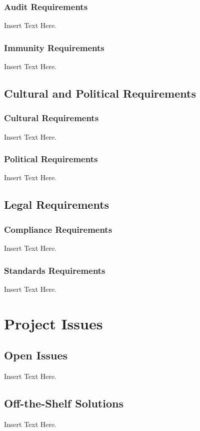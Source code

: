 \documentclass [12pt]{article}
\begin{document}
\subsubsection{Audit  Requirements }
		Insert Text Here. 

\subsubsection{Immunity Requirements  }
		Insert Text Here.

\subsection{Cultural and Political Requirements } 
\subsubsection{Cultural Requirements }
		Insert Text Here.

\subsubsection{Political Requirements }
		Insert Text Here.


\subsection{Legal Requirements}
\subsubsection{Compliance Requirements }
		Insert Text Here.
\subsubsection{Standards Requirements }
		Insert Text Here.





\section {Project Issues} 


\subsection{Open Issues}
	Insert Text Here.

\subsection{Off-the-Shelf Solutions}
	Insert Text Here.
\end{document}
